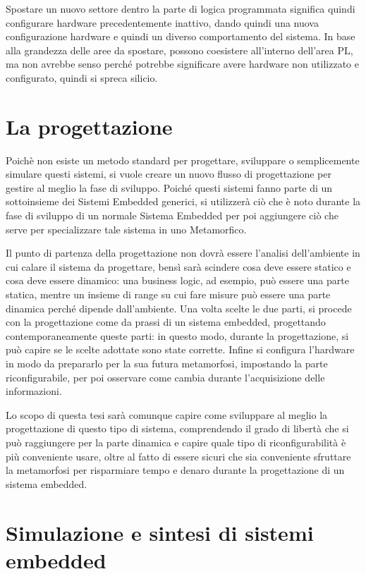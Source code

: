 \documentclass[11pt]{article} %
\begin{document}
Spostare un nuovo settore dentro la parte di logica programmata significa quindi configurare hardware precedentemente inattivo, dando quindi una nuova configurazione hardware e quindi un diverso comportamento del sistema. In base alla grandezza delle aree da spostare, possono coesistere all'interno dell'area PL, ma non avrebbe senso perché potrebbe significare avere hardware non utilizzato e configurato, quindi si spreca silicio.

\section{La progettazione}

Poichè non esiste un metodo standard per progettare, sviluppare o semplicemente simulare questi sistemi, si vuole creare un nuovo flusso di progettazione per gestire al meglio la fase di sviluppo. Poiché questi sistemi fanno parte di un sottoinsieme dei Sistemi Embedded generici, si utilizzerà ciò che è noto durante la fase di sviluppo di un normale Sistema Embedded per poi aggiungere ciò che serve per specializzare tale sistema in uno Metamorfico.

Il punto di partenza della progettazione non dovrà essere l'analisi dell'ambiente in cui calare il sistema da progettare, bensì sarà scindere cosa deve essere statico e cosa deve essere dinamico: una business logic, ad esempio, può essere una parte statica, mentre un insieme di range su cui fare misure può essere una parte dinamica perché dipende dall'ambiente. Una volta scelte le due parti, si procede con la progettazione come da prassi di un sistema embedded, progettando contemporaneamente queste parti: in questo modo, durante la progettazione, si può capire se le scelte adottate sono state corrette. Infine si configura l'hardware in modo da prepararlo per la sua futura metamorfosi, impostando la parte riconfigurabile, per poi osservare come cambia durante l'acquisizione delle informazioni.

Lo scopo di questa tesi sarà comunque capire come sviluppare al meglio la progettazione di questo tipo di sistema, comprendendo il grado di libertà che si può raggiungere per la parte dinamica e capire quale tipo di riconfigurabilità è più conveniente usare, oltre al fatto di essere sicuri che sia conveniente sfruttare la metamorfosi per risparmiare tempo e denaro durante la progettazione di un sistema embedded.

\section{Simulazione e sintesi di sistemi embedded}
\end{document}
